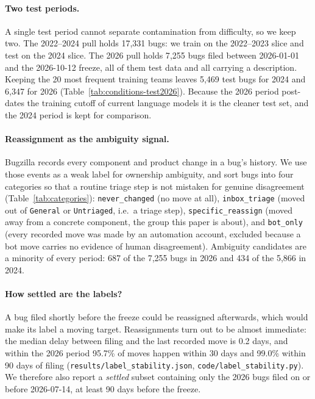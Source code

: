 \documentclass[sigconf,anonymous]{acmart}
\begin{document}
\paragraph{Two test periods.}
A single test period cannot separate contamination from difficulty, so we keep two. The 2022--2024
pull holds 17{,}331 bugs: we train on the 2022--2023 slice and test on the 2024 slice. The 2026
pull holds 7{,}255 bugs filed between 2026-01-01 and the 2026-10-12 freeze, all of them test data
and all carrying a description. Keeping the 20 most frequent training teams leaves 5{,}469 test
bugs for 2024 and 6{,}347 for 2026 (Table~\ref{tab:conditions-test2026}). Because the 2026 period
post-dates the training cutoff of current language models it is the cleaner test set, and the 2024
period is kept for comparison.

\paragraph{Reassignment as the ambiguity signal.}
Bugzilla records every component and product change in a bug's history. We use those events as a
weak label for ownership ambiguity, and sort bugs into four categories so that a routine triage
step is not mistaken for genuine disagreement (Table~\ref{tab:categories}):
\texttt{never\_changed} (no move at all),
\texttt{inbox\_triage} (moved out of \texttt{General} or \texttt{Untriaged}, i.e.\ a triage step),
\texttt{specific\_reassign} (moved away from a concrete component, the group this paper is about),
and \texttt{bot\_only} (every recorded move was made by an automation account, excluded because a
bot move carries no evidence of human disagreement). Ambiguity candidates are a minority of every
period: 687 of the 7{,}255 bugs in 2026 and 434 of the 5{,}866 in 2024.

\paragraph{How settled are the labels?}
A bug filed shortly before the freeze could be reassigned afterwards, which would make its label a
moving target. Reassignments turn out to be almost immediate: the median delay between filing and
the last recorded move is 0.2 days, and within the 2026 period 95.7\% of moves happen within 30
days and 99.0\% within 90 days of filing (\texttt{results/label\_stability.json},
\texttt{code/label\_stability.py}). We therefore also report a \emph{settled} subset containing
only the 2026 bugs filed on or before 2026-07-14, at least 90 days before the freeze.
\end{document}

